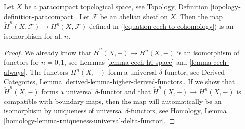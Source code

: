 \begin{lemma}
\label{lemma-cech-paracompact}
\begin{reference}
\cite[Chapter I, \S 3, no. 25, Proposition 7 and its Corollary,
pp. 217--218]{FAC}
\end{reference}
Let $X$ be a paracompact topological space, see
Topology, Definition \ref{topology-definition-paracompact}. Let
$\mathcal{F}$ be an abelian sheaf on $X$. Then
the map $\check{H}^n(X, \mathcal{F}) \to H^n(X, \mathcal{F})$ defined
in (\ref{equation-cech-to-cohomology}) is an isomorphism for
all $n$.
\end{lemma}

\begin{proof}
We already know that $\check{H}^n(X, -) \to H^n(X, -)$
is an isomorphism of functors for $n = 0, 1$, see
Lemmas \ref{lemma-cech-h0-space} and \ref{lemma-cech-always}.
The functors $H^n(X, -)$ form a universal $\delta$-functor, see
Derived Categories, Lemma \ref{derived-lemma-higher-derived-functors}.
If we show that $\check{H}^n(X, -)$ forms a universal $\delta$-functor
and that $\check{H}^n(X, -) \to H^n(X, -)$ is compatible with boundary
maps, then the map will automatically be an isomorphism by uniqueness
of universal $\delta$-functors, see
Homology, Lemma \ref{homology-lemma-uniqueness-universal-delta-functor}.


\end{proof}
